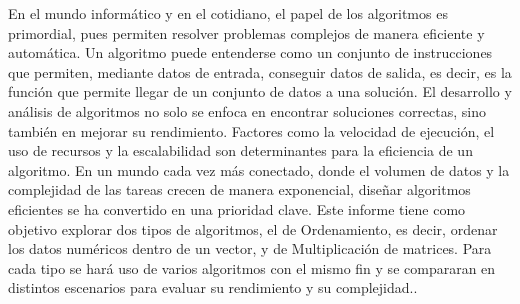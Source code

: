 En el mundo informático y en el cotidiano, el papel de los algoritmos es primordial,
pues permiten resolver problemas complejos de manera eficiente y automática. Un
algoritmo puede entenderse como un conjunto de instrucciones que permiten,
mediante datos de entrada, conseguir datos de salida, es decir, es la función que
permite llegar de un conjunto de datos a una solución.
El desarrollo y análisis de algoritmos no solo se enfoca en encontrar soluciones
correctas, sino también en mejorar su rendimiento. Factores como la velocidad de
ejecución, el uso de recursos y la escalabilidad son determinantes para la eficiencia de
un algoritmo. En un mundo cada vez más conectado, donde el volumen de datos y la
complejidad de las tareas crecen de manera exponencial, diseñar algoritmos
eficientes se ha convertido en una prioridad clave.
Este informe tiene como objetivo explorar dos tipos de algoritmos, el de Ordenamiento,
es decir, ordenar los datos numéricos dentro de un vector, y de Multiplicación de
matrices. Para cada tipo se hará uso de varios algoritmos con el mismo fin y se
compararan en distintos escenarios para evaluar su rendimiento y su complejidad.\cite{elsevier_abstract_2024}.
